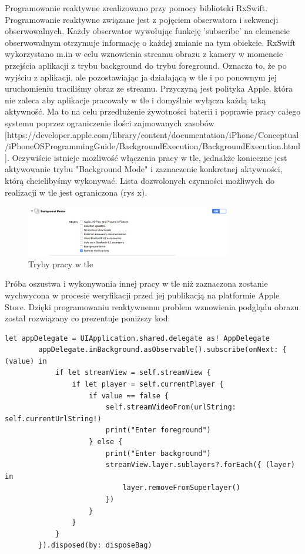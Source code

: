 Programowanie reaktywne zrealizowano przy pomocy biblioteki RxSwift. Programowanie reaktywne związane jest z pojęciem obserwatora i sekwencji obserwowalnych. Każdy obserwator wywołując funkcję 'subscribe' na elemencie obserwowalnym otrzymuje informację o każdej zmianie na tym obiekcie. RxSwift wykorzystano m.in w celu wznowienia streamu obrazu z kamery w momencie przejścia aplikacji z trybu background do trybu foreground. Oznacza to, że po wyjściu z aplikacji, ale pozostawiając ja działającą w tle i po ponownym jej uruchomieniu traciliśmy obraz ze streamu. Przyczyną jest polityka Apple, która nie zaleca aby aplikacje pracowały w tle i domyślnie wyłącza każdą taką aktywność. Ma to na celu przedłużenie żywotności baterii i poprawie pracy całego systemu poprzez ograniczenie ilości zajmowanych zasobów [https://developer.apple.com/library/content/documentation/iPhone/Conceptual/iPhoneOSProgrammingGuide/BackgroundExecution/BackgroundExecution.html].  Oczywiście istnieje możliwość włączenia pracy w tle, jednakże konieczne jest aktywowanie trybu "Background Mode" i zaznaczenie konkretnej aktywności, którą chcielibyśmy wykonywać. Lista dozwolonych czynności możliwych do realizacji w tle jest ograniczona (rys x). 
\begin{figure}[h]
	\centering
	\includegraphics[width=9cm]{backgroundModes}
	\caption{Tryby pracy w tle}
\end{figure}
Próba oszustwa i wykonywania innej pracy w tle niż zaznaczona zostanie wychwycona w procesie weryfikacji przed jej publikacją na platformie Apple Store. Dzięki programowaniu reaktywnemu problem wznowienia podglądu obrazu został rozwiązany co prezentuje poniższy kod:
\begin{verbatim}
let appDelegate = UIApplication.shared.delegate as! AppDelegate
        appDelegate.inBackground.asObservable().subscribe(onNext: { (value) in
            if let streamView = self.streamView {
                if let player = self.currentPlayer {
                    if value == false {
                        self.streamVideoFrom(urlString: self.currentUrlString!)
                        print("Enter foreground")
                    } else {
                        print("Enter background")
                        streamView.layer.sublayers?.forEach({ (layer) in
                            layer.removeFromSuperlayer()
                        })
                    }
                }
            }
        }).disposed(by: disposeBag)
\end{verbatim}
